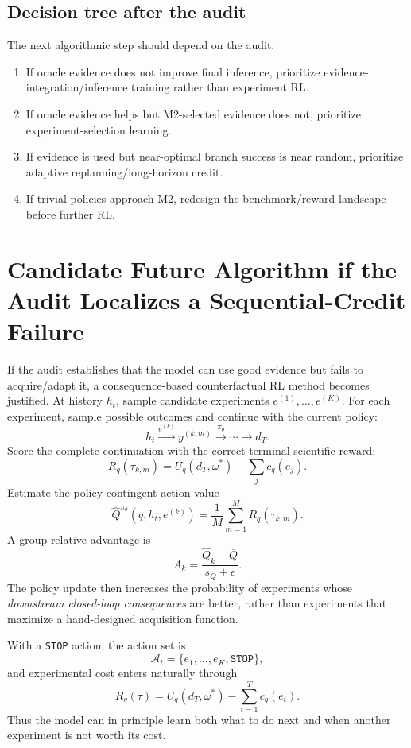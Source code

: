 \documentclass[11pt]{article}
\newcommand{\A}{\mathcal{A}}
\begin{document}
\subsection{Decision tree after the audit}
The next algorithmic step should depend on the audit:
\begin{enumerate}
    \item If oracle evidence does not improve final inference, prioritize evidence-integration/inference training rather than experiment RL.
    \item If oracle evidence helps but M2-selected evidence does not, prioritize experiment-selection learning.
    \item If evidence is used but near-optimal branch success is near random, prioritize adaptive replanning/long-horizon credit.
    \item If trivial policies approach M2, redesign the benchmark/reward landscape before further RL.
\end{enumerate}

\section{Candidate Future Algorithm if the Audit Localizes a Sequential-Credit Failure}
If the audit establishes that the model can use good evidence but fails to acquire/adapt it, a consequence-based counterfactual RL method becomes justified. At history $h_t$, sample candidate experiments $e^{(1)},\ldots,e^{(K)}$. For each experiment, sample possible outcomes and continue with the current policy:
\[
h_t\xrightarrow{e^{(k)}}y^{(k,m)}\xrightarrow{\pi_\theta}\cdots\xrightarrow{}d_T.
\]
Score the complete continuation with the correct terminal scientific reward:
\[
R_q(\tau_{k,m})=U_q(d_T,\omega^*)-\sum_j c_q(e_j).
\]
Estimate the policy-contingent action value
\[
\widehat Q^{\pi_\theta}(q,h_t,e^{(k)})
=\frac{1}{M}\sum_{m=1}^{M}R_q(\tau_{k,m}).
\]
A group-relative advantage is
\[
A_k
=\frac{\widehat Q_k-\overline Q}{s_Q+\epsilon}.
\]
The policy update then increases the probability of experiments whose \emph{downstream closed-loop consequences} are better, rather than experiments that maximize a hand-designed acquisition function.

With a \texttt{STOP} action, the action set is
\[
\A_t=\{e_1,\ldots,e_K,\texttt{STOP}\},
\]
and experimental cost enters naturally through
\[
R_q(\tau)=U_q(d_T,\omega^*)-\sum_{t=1}^{T}c_q(e_t).
\]
Thus the model can in principle learn both what to do next and when another experiment is not worth its cost.
\end{document}
